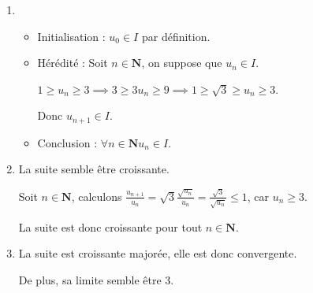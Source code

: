 \documentclass[a4paper,12pt,french]{article}
\newcommand{\N}{\mathbf{N}}
\begin{document}
\begin{Answer}
  \begin{enumerate}[label=\textbf{\arabic*.}]
    \item \begin{itemize}[label=\textbullet]
        \item Initialisation : $u_0\in I$ par définition.
        \item Hérédité : Soit $n\in\N$, on suppose que $u_n \in I$.

          $1\geqslant u_n \geqslant 3 \implies 3 \geqslant 3u_n
          \geqslant 9 \implies 1 \geqslant \sqrt3 \geqslant u_n
          \geqslant 3$.

          Donc $u_{n+1} \in I$.
        \item Conclusion : $\forall n\in\N u_n \in I$.
      \end{itemize}
    \item La suite semble être croissante.

      Soit $n\in \N$, calculons $\frac{u_{n+1}}{u_n} = \sqrt3
      \frac{\sqrt{u_n}}{u_n} = \frac{\sqrt{3}}{\sqrt{u_n}} \leqslant 1$,
      car $u_n\geqslant 3$.

      La suite est donc croissante pour tout $n\in\N$.
    \item La suite est croissante majorée, elle est donc convergente.

      De plus, sa limite semble être 3.
  \end{enumerate}
\end{Answer}
\end{document}
